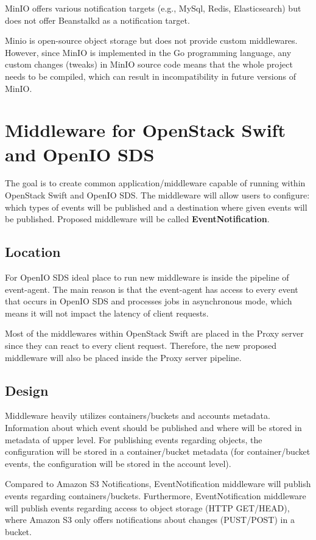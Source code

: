     MinIO offers various notification targets (e.g., MySql, Redis, Elasticsearch) but does not offer Beanstalkd as a notification target.

    Minio is open-source object storage but does not provide custom middlewares. However, since MinIO is implemented in the Go programming language, any custom changes (tweaks) in MinIO source code means that the whole project needs to be compiled, which can result in incompatibility in future versions of MinIO.

\section{Middleware for OpenStack Swift and OpenIO SDS}
    The goal is to create common application/middleware capable of running within OpenStack Swift and OpenIO SDS. The middleware will allow users to configure: which types of events will be published and a destination where given events will be published. Proposed middleware will be called \textbf{EventNotification}.

    \subsection{Location}
    For OpenIO SDS ideal place to run new middleware is inside the pipeline of event-agent. The main reason is that the event-agent has access to every event that occurs in OpenIO SDS and processes jobs in asynchronous mode, which means it will not impact the latency of client requests.

    Most of the middlewares within OpenStack Swift are placed in the Proxy server since they can react to every client request. Therefore, the new proposed middleware will also be placed inside the Proxy server pipeline.

    \subsection{Design}
    Middleware heavily utilizes containers/buckets and accounts metadata. Information about which event should be published and where will be stored in metadata of upper level. For publishing events regarding objects, the configuration will be stored in a container/bucket metadata (for container/bucket events, the configuration will be stored in the account level).

    Compared to Amazon S3 Notifications, EventNotification middleware will publish events regarding containers/buckets. Furthermore, EventNotification middleware will publish events regarding access to object storage (HTTP GET/HEAD), where Amazon S3 only offers notifications about changes (PUST/POST) in a bucket.


